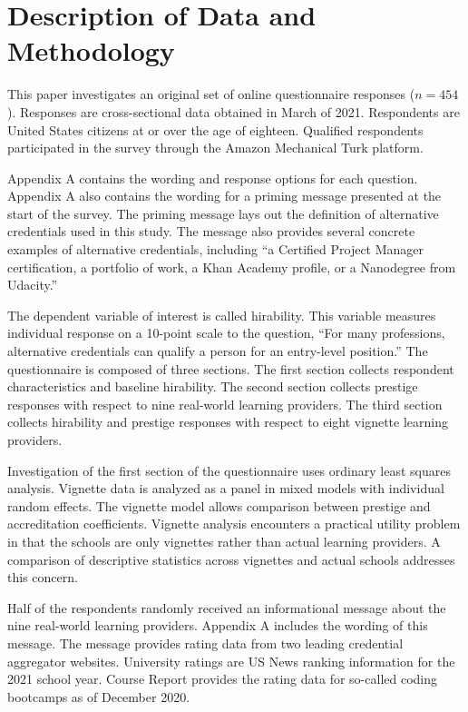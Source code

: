 \documentclass[review]{elsarticle}
\begin{document}
\section{Description of Data and Methodology}

This paper investigates an original set of online questionnaire responses ($n = 454$).
Responses are cross-sectional data obtained in March of 2021.
Respondents are United States citizens at or over the age of eighteen.
Qualified respondents participated in the survey through the Amazon Mechanical Turk platform.

Appendix A contains the wording and response options for each question.
Appendix A also contains the wording for a priming message presented at the start of the survey.
The priming message lays out the definition of alternative credentials used in this study.
The message also provides several concrete examples of alternative credentials,
including ``a Certified Project Manager certification,
a portfolio of work, a Khan Academy profile, or a Nanodegree from Udacity.''

The dependent variable of interest is called hirability.
This variable measures individual response on a 10-point scale to the question,
``For many professions, alternative credentials can qualify a person for an entry-level position.''
The questionnaire is composed of three sections.
The first section collects respondent characteristics and baseline hirability.
The second section collects prestige responses with respect to nine real-world learning providers.
The third section collects hirability and prestige responses with respect to eight vignette learning providers.


Investigation of the first section of the questionnaire uses ordinary least squares analysis.
Vignette data is analyzed as a panel in mixed models with individual random effects.
The vignette model allows comparison between prestige and accreditation coefficients.
Vignette analysis encounters a practical utility problem in that the schools are only vignettes rather than actual learning providers.
A comparison of descriptive statistics across vignettes and actual schools addresses this concern.

Half of the respondents randomly received an informational message about the nine real-world learning providers.
Appendix A includes the wording of this message.
The message provides rating data from two leading credential aggregator websites.
University ratings are US News ranking information for the 2021 school year.
Course Report provides the rating data for so-called coding bootcamps as of December 2020.
\end{document}
